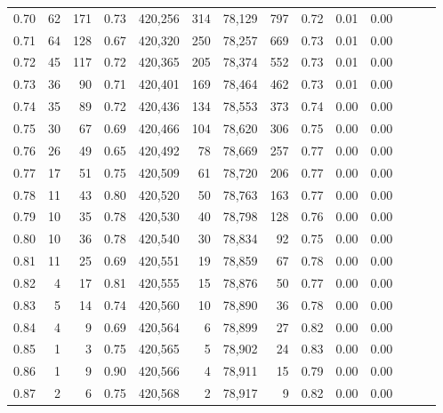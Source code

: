 \begin{tabular}{rrrrrrrrrrrrrr}
0.70 &      62 &    171 &  0.73 &  420,256 &      314 &  78,129 &     797 &  0.72 &  0.01 &      0.00 \\
0.71 &      64 &    128 &  0.67 &  420,320 &      250 &  78,257 &     669 &  0.73 &  0.01 &      0.00 \\
0.72 &      45 &    117 &  0.72 &  420,365 &      205 &  78,374 &     552 &  0.73 &  0.01 &      0.00 \\
0.73 &      36 &     90 &  0.71 &  420,401 &      169 &  78,464 &     462 &  0.73 &  0.01 &      0.00 \\
0.74 &      35 &     89 &  0.72 &  420,436 &      134 &  78,553 &     373 &  0.74 &  0.00 &      0.00 \\
0.75 &      30 &     67 &  0.69 &  420,466 &      104 &  78,620 &     306 &  0.75 &  0.00 &      0.00 \\
0.76 &      26 &     49 &  0.65 &  420,492 &       78 &  78,669 &     257 &  0.77 &  0.00 &      0.00 \\
0.77 &      17 &     51 &  0.75 &  420,509 &       61 &  78,720 &     206 &  0.77 &  0.00 &      0.00 \\
0.78 &      11 &     43 &  0.80 &  420,520 &       50 &  78,763 &     163 &  0.77 &  0.00 &      0.00 \\
0.79 &      10 &     35 &  0.78 &  420,530 &       40 &  78,798 &     128 &  0.76 &  0.00 &      0.00 \\
0.80 &      10 &     36 &  0.78 &  420,540 &       30 &  78,834 &      92 &  0.75 &  0.00 &      0.00 \\
0.81 &      11 &     25 &  0.69 &  420,551 &       19 &  78,859 &      67 &  0.78 &  0.00 &      0.00 \\
0.82 &       4 &     17 &  0.81 &  420,555 &       15 &  78,876 &      50 &  0.77 &  0.00 &      0.00 \\
0.83 &       5 &     14 &  0.74 &  420,560 &       10 &  78,890 &      36 &  0.78 &  0.00 &      0.00 \\
0.84 &       4 &      9 &  0.69 &  420,564 &        6 &  78,899 &      27 &  0.82 &  0.00 &      0.00 \\
0.85 &       1 &      3 &  0.75 &  420,565 &        5 &  78,902 &      24 &  0.83 &  0.00 &      0.00 \\
0.86 &       1 &      9 &  0.90 &  420,566 &        4 &  78,911 &      15 &  0.79 &  0.00 &      0.00 \\
0.87 &       2 &      6 &  0.75 &  420,568 &        2 &  78,917 &       9 &  0.82 &  0.00 &      0.00 \\

\end{tabular}
